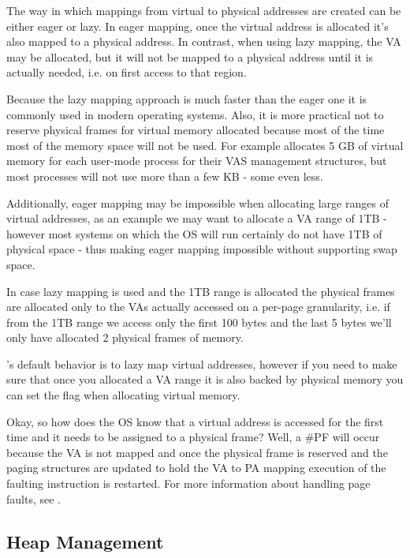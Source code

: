 \begin{appendices}
The way in which mappings from virtual to physical addresses are created can be either eager or lazy.
In eager mapping, once the virtual address is allocated it's also mapped to a physical address. In
contrast, when using lazy mapping, the VA may be allocated, but it will not be mapped to a physical
address until it is actually needed, i.e. on first access to that region.

Because the lazy mapping approach is much faster than the eager one it is commonly used in modern
operating systems. Also, it is more practical not to reserve physical frames for virtual memory
allocated because most of the time most of the memory space will not be used. For example
\projectname allocates 5 GB of virtual memory for each user-mode process for their VAS management
structures, but most processes will not use more than a few KB - some even less.

Additionally, eager mapping may be impossible when allocating large ranges of virtual
addresses, as an example we may want to allocate a VA range of 1TB - however most systems on which
the OS will run certainly do not have 1TB of physical space - thus making eager mapping impossible
without supporting swap space.

In case lazy mapping is used and the 1TB range is allocated the physical frames are allocated only
to the VAs actually accessed on a per-page granularity, i.e. if from the 1TB range we access only
the first 100 bytes and the last 5 bytes we'll only have allocated 2 physical frames of memory.

\projectname's default behavior is to lazy map virtual addresses, however if you need to make sure
that once you allocated a VA range it is also backed by physical memory you can set the
 flag when allocating virtual memory.

Okay, so how does the OS know that a virtual address is accessed for the first time and it needs to
be assigned to a physical frame? Well, a \#PF will occur because the VA is not mapped and once the
physical frame is reserved and the paging structures are updated to hold the VA to PA mapping
execution of the faulting instruction is restarted. For more information about handling page faults,
see .

\subsection{Heap Management}


\end{appendices}
